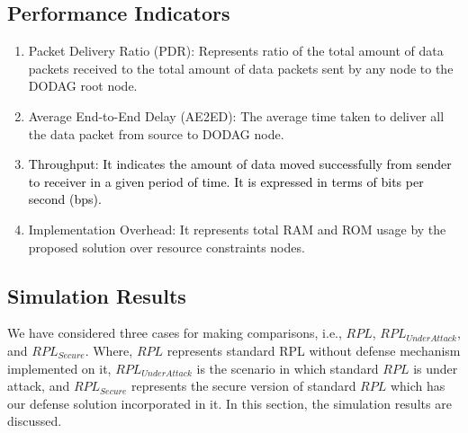 \documentclass[conference, a4paper]{IEEEtran}
\begin{document}
\subsection{Performance Indicators}
\begin{enumerate}
\item Packet Delivery Ratio (PDR): Represents ratio of the total amount of data packets received to the total amount of data packets sent by any node to the DODAG root node.
    
\item Average End-to-End Delay (AE2ED): The average time taken to deliver all the data packet from source to DODAG node. 
    
    
    \item \textcolor{black}{Throughput: It indicates the amount of data moved successfully from sender to receiver in a given period of time. It is expressed in terms of bits per second (bps).}
\item Implementation Overhead: It represents total RAM and ROM usage by the proposed solution over resource constraints nodes.
\end{enumerate}

\subsection{Simulation Results}

We have considered three cases for making comparisons, i.e., $RPL$, $RPL_{Under Attack}$, and $RPL_{Secure}$. Where, $RPL$ represents standard RPL without defense mechanism implemented on it, $RPL_{Under Attack}$ is the scenario in which standard $RPL$ is under attack, and $RPL_{Secure}$ represents the secure version of standard $RPL$ which has our defense solution incorporated in it. In this section, the simulation results are discussed.
\end{document}

